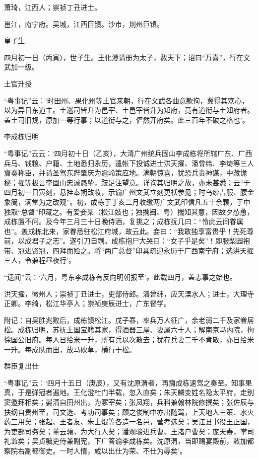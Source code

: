 \documentclass[]{article}
\begin{document}
萧琦，江西人；崇祯丁丑进士。

邕江，南宁府。吴城，江西巨镇。沙市，荆州巨镇。

皇子生

四月初一日（丙寅），世子生。王化澄请册为太子，赦天下；诏曰``万喜''，行在文武加一级。

土官升授

``粤事记''云：`时田州、果化州等土官来朝，行在文武各曲意款徇，冀得其欢心，以为异日东道主。土巡司皆升为邑宰、土邑宰皆升为知府，竟有道衔与土知府者。盖土司旧规，原加一等行事；以道衔与之，俨然开府矣。此三百年不破之格也'。

李成栋归明

``粤事记''云云：`四月初十日（乙亥），大清广州统兵固山李成栋将所辖广东、广西兵马、钱粮、户籍、土地悉归永历，遣帐下投诚进士洪天擢、潘曾纬、李绮等三人齎奏称臣，并请圣驾东跸肇庆为逾岭策应地。满朝惊喜，犹恐兵贵神谋，中藏诡秘；擢等极言李固山忠诚恳挚，跂足注望意。详询其归明之故，亦未甚悉；云``于四月初一日寅刻，悬挂奉朔改妆，示谕广州文武立刻更袄参见；时乌纱吉服、腰金象简，满堂为之改观''。初，成栋于丁亥二月收缴两广文武印信凡五十余颗，于中独取``总督''印藏之。有爱妾某（松江妓也；独携闽、粤）揣知其意，因故夕怂恿，成栋置不问。及今年三月三十日晚侍酒，复挑之；成栋抚几曰：``怜此云间眷属也''。盖成栋北来，家眷悉驻松江府城，故云此。妾曰：``我敢独享富贵乎！先死尊前，以成君子之志''。遂引刀自刎。成栋抱尸大哭曰：``女子乎是矣''！即服梨园袍带、冠进贤冠，四拜而殓之。将``两广总督''印具疏迎永历于广西南宁府；选洪天擢三人，令兼程昼夜行'。

``遗闻''云：`六月，粤东李成栋有反向明朝报至'。此载四月，盖志事之始也。

洪天擢，徽州人；崇祯丁丑进士，吏部侍郎。潘曾纬，应天溧水人；进士，大理寺正卿。李绮，松江华亭人；崇祯庚辰进士，广东督学。

附记：自吴胜兆败后，成栋镇松江。戊子春，率兵万人征广，余老弱二千及家眷居松。成栋归明，苏抚土国宝籍其家，得酒器三屋、妻属六十人；解南京马内院，拘徐国公旧府。每人日给米一升，所有兵以次散去；犹存兵妻二千不肯散，亦日给米一升。每成队而出，放马砍草，横行于松。

群臣复出仕

``粤事记''云：`四月十五日（庚辰），又有沈原渭者，再齎成栋速驾之奏至。知事果真，于是弹冠者遍地。王化澄杜门半载，忽入直矣；朱天麟变姓名隐太平府，走别窦邀拜相矣；晏清自田州出，为冢宰矣；张凤翔，兵科兼翰林院修撰矣；张佐辰与扶纲自贵州至，司文选、考功司事矣；顾之俊制中亦出随驾，上天地人三策、水火药三用矣；张起、王者友、朱士焜等各造一名邑，营考选矣；吴江县书役王正国，为吏部司务矣；董云骧，为大行人矣；潘观骏进兵曹、王渚户曹矣；庞天寿，掌司礼监矣；吴贞毓吏侍兼副宪，下广答谕李成栋矣。沈原渭，当即赐宴殿前，敕加都察院右副都御史。一时人情，咸以出仕为荣、不仕为辱矣'。
\end{document}
